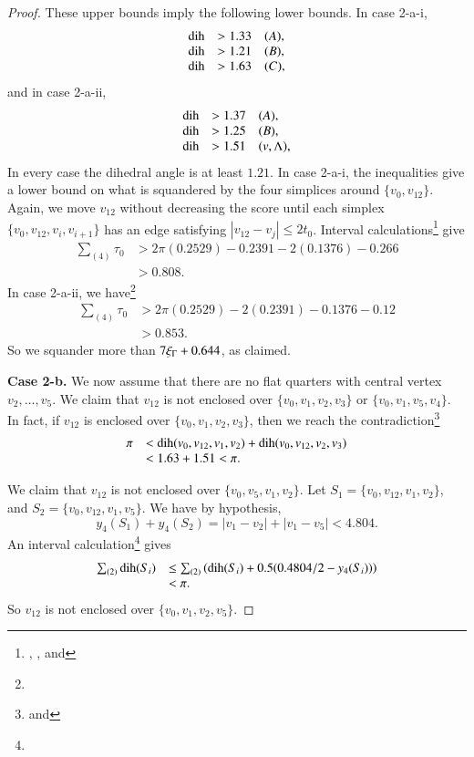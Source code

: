 \begin{proof}
These upper bounds imply the following lower bounds.  In case
2-a-i,
$$
\begin{array}{lll}
\operatorname{dih} &> 1.33 \quad(A),\\
\operatorname{dih} &> 1.21 \quad(B),\\
\operatorname{dih} &> 1.63 \quad(C),\\
\end{array}
$$
and in case 2-a-ii,
$$
\begin{array}{lll}
\operatorname{dih} &> 1.37 \quad(A),\\
\operatorname{dih} &> 1.25 \quad(B),\\
\operatorname{dih} &> 1.51 \quad(v,\Lambda),\\
\end{array}
$$
In every case the dihedral angle is at least $1.21$. In case
2-a-i, the inequalities give a lower bound on what is squandered
by the four simplices around $\{v_0,v_{12}\}$. Again, we move $v_{12}$
without decreasing the score until each simplex
$\{v_0,v_{12},v_i,v_{i+1}\}$ has an edge satisfying
$|v_{12}-v_j|\le2t_0$. Interval
calculations\footnote{, , and
} give
    $$
    \begin{array}{lll}
    \sum_{(4)}\tau_0 &> 2\pi (0.2529) - 0.2391-2(0.1376)-0.266\\
        &>0.808.
    \end{array}
    $$
In case 2-a-ii, we have\footnote{}
    $$
    \begin{array}{lll}
    \sum_{(4)}\tau_0 &> 2\pi (0.2529) - 2(0.2391)-0.1376-0.12\\
        &>0.853.
    \end{array}
    $$
So we squander more than $7\xi_\Gamma+0.644$, as claimed.

{\bf Case 2-b.}  We now assume that there are no flat quarters
with central vertex $v_2,\ldots,v_5$. We claim
 that $v_{12}$ is not enclosed over $\{v_0,v_1,v_2,v_3\}$ or
$\{v_0,v_1,v_5,v_4\}$. In fact, if $v_{12}$ is enclosed over
$\{v_0,v_1,v_2,v_3\}$, then we reach the
contradiction\footnote{ and }
    $$
    \begin{array}{lll}
    \pi&<\operatorname{dih}(v_0,v_{12},v_1,v_2)+\operatorname{dih}(v_0,v_{12},v_2,v_3)\\
        &< 1.63+1.51 < \pi.
    \end{array}
    $$

We claim
 that $v_{12}$ is not enclosed over $\{v_0,v_5,v_1,v_2\}$.
Let $S_1=\{v_0,v_{12},v_1,v_2\}$, and $S_2=\{v_0,v_{12},v_1,v_5\}$.  We
have by hypothesis,
$$y_4(S_1)+y_4(S_2) = |v_1-v_2|+|v_1-v_5|< 4.804.$$
An interval calculation\footnote{} gives
    $$
    \begin{array}{lll}
    \sum_{(2)}\operatorname{dih}(S_i) &\le \sum_{(2)}
    \left(\operatorname{dih}(S_i)+0.5(0.4804/2-y_4(S_i))\right)\\
    &<\pi.
    \end{array}
    $$
So $v_{12}$ is not enclosed over $\{v_0,v_1,v_2,v_5\}$.


\end{proof}
